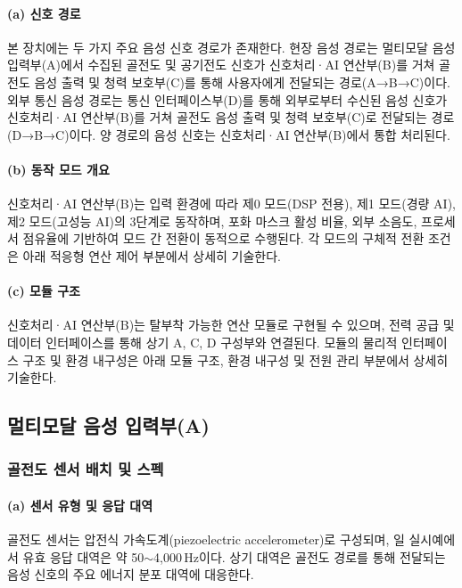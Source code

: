 \documentclass{article}
\begin{document}
\paragraph{(a) 신호 경로}

본 장치에는 두 가지 주요 음성 신호 경로가 존재한다. 현장 음성 경로는 멀티모달 음성 입력부(A)에서 수집된 골전도 및 공기전도 신호가 신호처리·AI 연산부(B)를 거쳐 골전도 음성 출력 및 청력 보호부(C)를 통해 사용자에게 전달되는 경로(A→B→C)이다. 외부 통신 음성 경로는 통신 인터페이스부(D)를 통해 외부로부터 수신된 음성 신호가 신호처리·AI 연산부(B)를 거쳐 골전도 음성 출력 및 청력 보호부(C)로 전달되는 경로(D→B→C)이다. 양 경로의 음성 신호는 신호처리·AI 연산부(B)에서 통합 처리된다.

\paragraph{(b) 동작 모드 개요}

신호처리·AI 연산부(B)는 입력 환경에 따라 제0 모드(DSP 전용), 제1 모드(경량 AI), 제2 모드(고성능 AI)의 3단계로 동작하며, 포화 마스크 활성 비율, 외부 소음도, 프로세서 점유율에 기반하여 모드 간 전환이 동적으로 수행된다. 각 모드의 구체적 전환 조건은 아래 적응형 연산 제어 부분에서 상세히 기술한다.

\paragraph{(c) 모듈 구조}

신호처리·AI 연산부(B)는 탈부착 가능한 연산 모듈로 구현될 수 있으며, 전력 공급 및 데이터 인터페이스를 통해 상기 A, C, D 구성부와 연결된다. 모듈의 물리적 인터페이스 구조 및 환경 내구성은 아래 모듈 구조, 환경 내구성 및 전원 관리 부분에서 상세히 기술한다.

\subsection{멀티모달 음성 입력부(A)}

\subsubsection{골전도 센서 배치 및 스펙}

\paragraph{(a) 센서 유형 및 응답 대역}

골전도 센서는 압전식 가속도계(piezoelectric accelerometer)로 구성되며, 일 실시예에서 유효 응답 대역은 약 50$\sim$4{,}000\,Hz이다. 상기 대역은 골전도 경로를 통해 전달되는 음성 신호의 주요 에너지 분포 대역에 대응한다.
\end{document}
